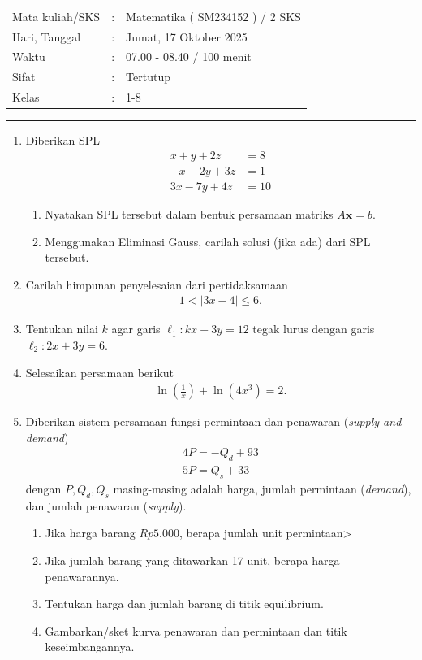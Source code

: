 \documentclass[10pt,openany,a4paper]{article}
\theoremstyle{definition}
\theoremstyle{definition}
\theoremstyle{plain}
\begin{document}
    \begin{center}
	\begin{tabular}{lcl}
		Mata kuliah/SKS & : & Matematika ( SM234152 ) / 2 SKS\\
		Hari, Tanggal & : & Jumat, 17 Oktober 2025\\
		Waktu & : & 07.00 - 08.40 / 100 menit\\
		Sifat & : & Tertutup\\
		Kelas & : & 1-8\
  ~
	\end{tabular}
    
    \noindent\rule{\textwidth}{2.pt}
        \end{center}
\begin{enumerate}
    \item Diberikan SPL 
    \begin{align*}
        x+y+2z &= 8\\
        -x-2y+3z &= 1\\
        3x-7y+4z &= 10
    \end{align*}
    \begin{enumerate}
        \item Nyatakan SPL tersebut dalam bentuk persamaan matriks $A\mathbf{x}=b$.
        \item Menggunakan Eliminasi Gauss, carilah solusi (jika ada) dari SPL tersebut.
    \end{enumerate}
    \item Carilah himpunan penyelesaian dari pertidaksamaan
    \begin{align*}
        1<|3x-4|\leq 6.
    \end{align*}
    \item Tentukan nilai $k$ agar garis $\ell_1:kx-3y=12$ tegak lurus dengan garis $\ell_2:2x+3y=6$.
    \item Selesaikan persamaan berikut 
    \begin{align*}
        \ln \left(\frac{1}{x}\right)+\ln(4x^3)=2.
    \end{align*}
    \item Diberikan sistem persamaan fungsi permintaan dan penawaran (\textit{supply and demand})
    \begin{align*}
       4P=-Q_d+93\\
       5P=Q_s+33
    \end{align*}
    dengan $P,Q_d,Q_s$ masing-masing adalah harga, jumlah permintaan (\textit{demand}), dan jumlah penawaran (\textit{supply}).
    \begin{enumerate}
        \item Jika harga barang $Rp5.000$, berapa jumlah unit permintaan>
        \item Jika jumlah barang yang ditawarkan 17 unit, berapa harga penawarannya.
        \item Tentukan harga dan jumlah barang di titik equilibrium.
        \item Gambarkan/sket kurva penawaran dan permintaan dan titik keseimbangannya.
    \end{enumerate}
\end{enumerate}
\newpage 


\end{document}
